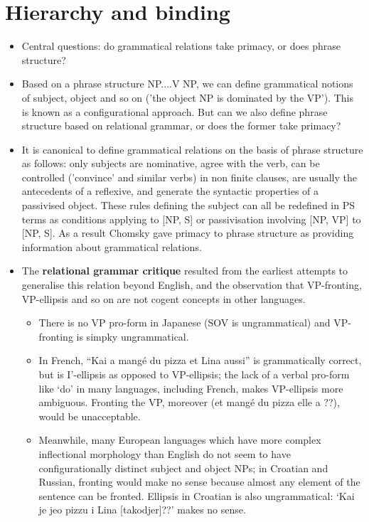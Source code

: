 \documentclass{article}
\begin{document}
\section{Hierarchy and binding}
\begin{itemize}
\subsection{Relational grammar vs phrase structure}
    \item Central questions: do grammatical relations take primacy, or does phrase structure?
    \item Based on a phrase structure NP....V NP, we can define grammatical notions of subject, object and so on ('the object NP is dominated by the VP'). This is known as a configurational approach. But can we also define phrase structure based on relational grammar, or does the former take primacy?
    \item It is canonical to define grammatical relations on the basis of phrase structure as follows: only subjects are nominative, agree with the verb, can be controlled ('convince' and similar verbs) in non finite clauses, are usually the antecedents of a reflexive, and generate the syntactic properties of a passivised object. These rules defining the subject can all be redefined in PS terms as conditions applying to [NP, S] or passivisation involving [NP, VP] to [NP, S]. As a result Chomsky gave primacy to phrase structure as providing information about grammatical relations.
    \item The \textbf{relational grammar critique} resulted from the earliest attempts to generalise this relation beyond English, and the observation that VP-fronting, VP-ellipsis and so on are not cogent concepts in other languages.
    \begin{itemize}
        \item There is no VP pro-form in Japanese (SOV is ungrammatical) and VP-fronting is simpky ungrammatical.
        \item In French, “Kai a mangé du pizza et Lina aussi” is grammatically correct, but is I’-ellipsis as opposed to VP-ellipsis; the lack of a verbal pro-form like ‘do’ in many languages, including French, makes VP-ellipsis more ambiguous. Fronting the VP, moreover (et mangé du pizza elle a ??), would be unacceptable.
        \item Meanwhile, many European languages which have more complex inflectional morphology than English do not seem to have configurationally distinct subject and object NPs; in Croatian and Russian, fronting would make no sense because almost any element of the sentence can be fronted. Ellipsis in Croatian is also ungrammatical: ‘Kai je jeo pizzu i Lina [takodjer]??’ makes no sense.

\end{itemize}
\end{itemize}
\end{document}
